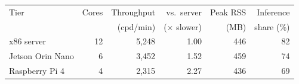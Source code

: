 \begin{tabular}{lrrrrr}
\toprule
Tier & Cores & Throughput & vs.\ server & Peak RSS & Inference \\
 & & (cpd/min) & ($\times$ slower) & (MB) & share (\%) \\
\midrule
x86 server & 12 & 5,248 & 1.00 & 446 & 82 \\
Jetson Orin Nano & 6 & 3,452 & 1.52 & 459 & 74 \\
Raspberry Pi 4 & 4 & 2,315 & 2.27 & 436 & 69 \\
\bottomrule
\end{tabular}